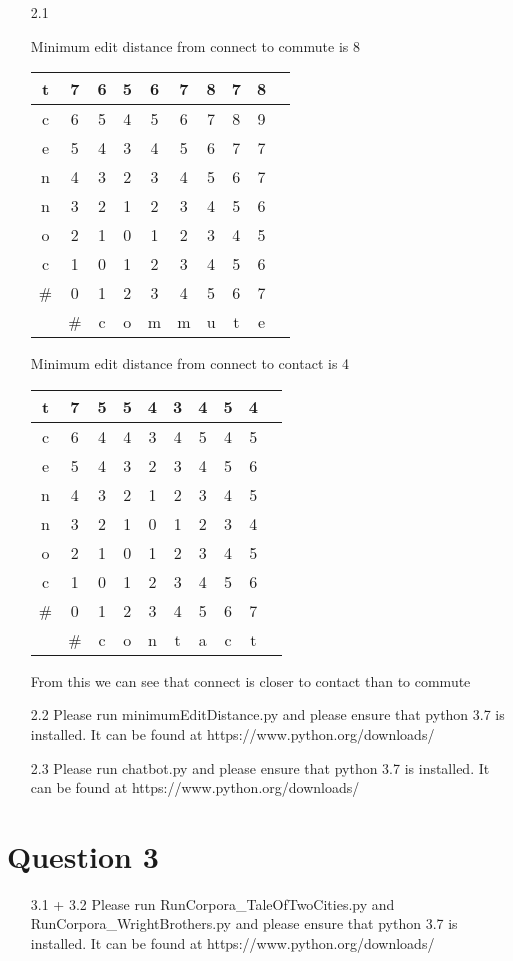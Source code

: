 \documentclass[10pt,a4paper]{article}
\begin{document}
\begin{enumerate}[leftmargin=\labelsep]
\item[2.1] 

Minimum edit distance from connect to commute is 8

\begin{tabular}{|c|c|c|c|c|c|c|c|c|c|}
\hline
t  & 7  & 6 & 5 & 6 & 7 & 8 & 7 & 8 \\
\hline
c  & 6  & 5 & 4 & 5 & 6 & 7 & 8 & 9 \\
\hline
e  & 5  & 4 & 3 & 4 & 5 & 6 & 7 & 7 \\
\hline
n  & 4  & 3 & 2 & 3 & 4 & 5 & 6 & 7 \\
\hline
n  & 3  & 2 & 1 & 2 & 3 & 4 & 5 & 6 \\
\hline
o  & 2  & 1 & 0 & 1 & 2 & 3 & 4 & 5 \\
\hline
c  & 1  & 0 & 1 & 2 & 3 & 4 & 5 & 6 \\
\hline
\# & 0  & 1 & 2 & 3 & 4 & 5 & 6 & 7 \\
\hline
   & \# & c & o & m & m & u & t & e \\
\hline
\end{tabular}

Minimum edit distance from connect to contact is 4

\begin{tabular}{|c|c|c|c|c|c|c|c|c|c|}
\hline
t  &  7 & 5 & 5 & 4 & 3 & 4 & 5 & 4 \\
\hline
c  &  6 & 4 & 4 & 3 & 4 & 5 & 4 & 5 \\ 
\hline
e  &  5 & 4 & 3 & 2 & 3 & 4 & 5 & 6 \\
\hline
n  &  4 & 3 & 2 & 1 & 2 & 3 & 4 & 5 \\
\hline
n  &  3 & 2 & 1 & 0 & 1 & 2 & 3 & 4 \\
\hline
o  &  2 & 1 & 0 & 1 & 2 & 3 & 4 & 5 \\
\hline
c  &  1 & 0 & 1 & 2 & 3 & 4 & 5 & 6 \\
\hline
\# &  0 & 1 & 2 & 3 & 4 & 5 & 6 & 7 \\
\hline
   & \# & c & o & n & t & a & c & t \\
\hline
\end{tabular}

From this we can see that connect is closer to contact than to commute

\item[2.2]
Please run minimumEditDistance.py and please ensure that python 3.7 is installed. It can be found at
https://www.python.org/downloads/
\item[2.3]
Please run chatbot.py and please ensure that python 3.7 is installed. It can be found at
https://www.python.org/downloads/
\end{enumerate}

\section{Question 3}

\begin{enumerate}[leftmargin=\labelsep]

\item[3.1 + 3.2]
Please run RunCorpora\_TaleOfTwoCities.py and RunCorpora\_WrightBrothers.py and please ensure that python 3.7 is installed. It can be found at
https://www.python.org/downloads/
\end{enumerate}
\end{document}
